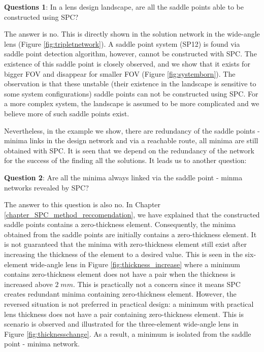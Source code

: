 \vspace{1em}

\textbf{Questions 1}:  In a lens design landscape, are all the saddle points able to be constructed using SPC? 

The answer is no. This is directly shown in the solution network in the wide-angle lens (Figure \ref{fig:tripletnetwork}). A saddle point system (SP12) is found via saddle point detection algorithm, however, cannot be constructed with SPC. The existence of this saddle point is closely observed, and we show that it exists for bigger FOV and disappear for smaller FOV (Figure \ref{fig:systemborn}). The observation is that these unstable (their existence in the landscape is sensitive to some system configurations) saddle points can not be constructed using SPC. For a more complex system, the landscape is assumed to be more complicated and we believe more of such saddle points exist. 

Nevertheless, in the example we show, there are redundancy of the saddle points - minima links in the design network and via a reachable route, all minima are still obtained with SPC. It is seen that we depend on the redundancy of the network for the success of the finding all the solutions. It leads us to another question: 
\vspace{1em}

\textbf{Question 2}: Are all the minima always linked via the saddle point - minma networks revealed by SPC?

The answer to this question is also no. In Chapter \ref{chapter_SPC_method_reccomendation}, we have explained that the constructed saddle points contains a zero-thickness element. Consequently, the minima obtained from the saddle points are initially contains a zero-thickness element. It is not guaranteed that the minima with zero-thickness element still exist after increasing the thickness of the element to a desired value. This is seen in the six-element wide-angle lens in Figure \ref{fig:thickness_increase} where a minimum contains zero-thickness element does not have a pair when the thickness is increased above $2 \;mm$. This is practically not a concern since it means SPC creates redundant minima containing zero-thickness element. However, the reversed situation is not preferred in practical design: a minimum with practical lens thickness does not have a pair containing zero-thickness element. This is scenario is observed and illustrated for the three-element wide-angle lens in Figure \ref{fig:thicknesschange}. As a result, a minimum is isolated from the saddle point - minima network. 

